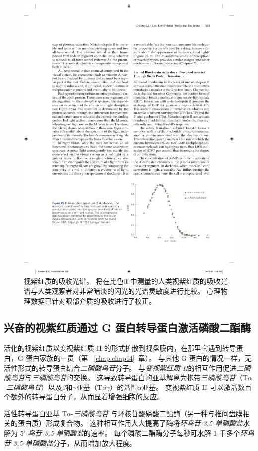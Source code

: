 \begin{figure}[htbp]
	\centering
	\includegraphics[width=0.8\linewidth]{chap22/fig_22_9}
	\caption{视紫红质的吸收光谱。 
		将在比色皿中测量的人类视紫红质的吸收光谱与人类观察者对非常暗淡的闪光的光谱灵敏度进行比较。
		心理物理数据已针对眼部介质的吸收进行了校正。}
	\label{fig:22_9}
\end{figure}



\subsection{兴奋的视紫红质通过 G 蛋白转导蛋白激活磷酸二酯酶}

活化的视紫红质以变视紫红质 II 的形式扩散到视盘膜内，在那里它遇到转导蛋白，G 蛋白家族的一员（第 ~\ref{chap:chap14}~章）。
与其他 G 蛋白的情况一样，无活性形式的转导蛋白结合\textit{二磷酸鸟苷}分子。
与\textit{变视紫红质 II}的相互作用促进\textit{二磷酸鸟苷}与\textit{三磷酸鸟苷}的交换。
这导致转导蛋白的亚基解离为携带\textit{三磷酸鸟苷}（T$\alpha$-\textit{三磷酸鸟苷}）以及$\beta$和$\gamma$亚基（T$\beta$$\gamma$）的活性$\alpha$亚基。
变视紫红质 II 可以激活数百个额外的转导蛋白分子，从而显着增强细胞的反应。


活性转导蛋白亚基 T$\alpha$-\textit{三磷酸鸟苷} 与环核苷酸磷酸二酯酶（另一种与椎间盘膜相关的蛋白质）形成复合物。
这种相互作用大大提高了酶将\textit{环鸟苷-3,5-单磷酸盐}水解为 5'-\textit{鸟苷-3,5-单磷酸盐}的速率。
每个磷酸二酯酶分子每秒可水解 1 千多个\textit{环鸟苷-3,5-单磷酸盐}分子，从而增加放大程度。


